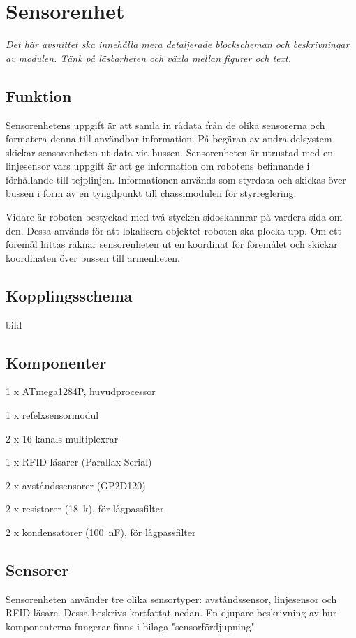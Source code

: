 \section{Sensorenhet}
\emph{Det här avsnittet ska innehålla mera detaljerade blockscheman och beskrivningar av modulen.
Tänk på läsbarheten och växla mellan figurer och text.}

\subsection{Funktion}
Sensorenhetens uppgift är att samla in rådata från de olika sensorerna och formatera denna till användbar information. På begäran av andra delsystem skickar sensorenheten ut data via bussen. Sensorenheten är utrustad
med en linjesensor vars uppgift är att ge information om robotens befinnande i förhållande till tejplinjen. Informationen används som styrdata och skickas över bussen i form av en tyngdpunkt till chassimodulen för styrreglering.

Vidare är roboten bestyckad med två stycken sidoskannrar på vardera sida om den. Dessa används för att lokalisera objektet roboten ska plocka upp. Om ett föremål hittas räknar sensorenheten ut en koordinat för föremålet och skickar koordinaten över bussen till armenheten.

\subsection{Kopplingsschema}
bild

\subsection{Komponenter}
\begin{packed_itemize}
\item 1 x ATmega1284P, huvudprocessor
\item 1 x refelxsensormodul
\item 2 x 16-kanals multiplexrar
\item 1 x RFID-läsarer (Parallax Serial)
\item 2 x avståndssensorer (GP2D120)
\item 2 x resistorer (18~k\ohm), för lågpassfilter
\item 2 x kondensatorer (100~nF), för lågpassfilter
\end{packed_itemize}

\subsection{Sensorer}
Sensorenheten använder tre olika sensortyper: avståndssensor, linjesensor och RFID-läsare.
Dessa beskrivs kortfattat nedan. En djupare beskrivning av hur komponenterna fungerar finns i bilaga "sensorfördjupning"

